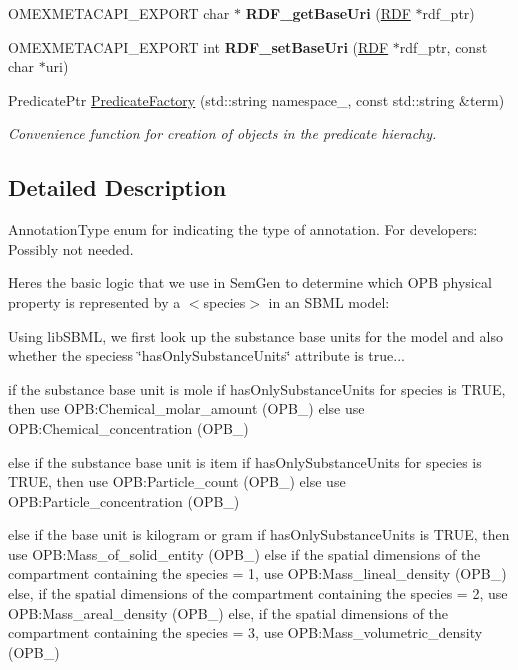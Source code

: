 \begin{DoxyCompactItemize}
\item 
\mbox{\label{namespaceomexmeta_a5d07b1a3b03615813dbb9efb62efda45}} 
O\+M\+E\+X\+M\+E\+T\+A\+C\+A\+P\+I\+\_\+\+E\+X\+P\+O\+RT char $\ast$ {\bfseries R\+D\+F\+\_\+get\+Base\+Uri} (\hyperlink{classomexmeta_1_1RDF}{R\+DF} $\ast$rdf\+\_\+ptr)
\item 
\mbox{\label{namespaceomexmeta_a64ae848c4570f1efb4d47e795b76adcd}} 
O\+M\+E\+X\+M\+E\+T\+A\+C\+A\+P\+I\+\_\+\+E\+X\+P\+O\+RT int {\bfseries R\+D\+F\+\_\+set\+Base\+Uri} (\hyperlink{classomexmeta_1_1RDF}{R\+DF} $\ast$rdf\+\_\+ptr, const char $\ast$uri)
\item 
Predicate\+Ptr \hyperlink{namespaceomexmeta_a0a8d50daa10e421d0722520cdef0ab9a}{Predicate\+Factory} (std\+::string namespace\+\_\+, const std\+::string \&term)
\begin{DoxyCompactList}\small\item\em Convenience function for creation of objects in the predicate hierachy. \end{DoxyCompactList}\end{DoxyCompactItemize}


\subsection{Detailed Description}
Annotation\+Type enum for indicating the type of annotation. For developers\+: Possibly not needed.

Here\textquotesingle{}s the basic logic that we use in Sem\+Gen to determine which O\+PB physical property is represented by a $<$species$>$ in an S\+B\+ML model\+:

Using lib\+S\+B\+ML, we first look up the substance base units for the model and also whether the species\textquotesingle{}s \char`\"{}has\+Only\+Substance\+Units\char`\"{} attribute is true...

if the substance base unit is mole if has\+Only\+Substance\+Units for species is T\+R\+UE, then use O\+PB\+:Chemical\+\_\+molar\+\_\+amount (O\+P\+B\+\_) else use O\+PB\+:Chemical\+\_\+concentration (O\+P\+B\+\_)

else if the substance base unit is item if has\+Only\+Substance\+Units for species is T\+R\+UE, then use O\+PB\+:Particle\+\_\+count (O\+P\+B\+\_) else use O\+PB\+:Particle\+\_\+concentration (O\+P\+B\+\_)

else if the base unit is kilogram or gram if has\+Only\+Substance\+Units is T\+R\+UE, then use O\+PB\+:Mass\+\_\+of\+\_\+solid\+\_\+entity (O\+P\+B\+\_) else if the spatial dimensions of the compartment containing the species = 1, use O\+PB\+:Mass\+\_\+lineal\+\_\+density (O\+P\+B\+\_) else, if the spatial dimensions of the compartment containing the species = 2, use O\+PB\+:Mass\+\_\+areal\+\_\+density (O\+P\+B\+\_) else, if the spatial dimensions of the compartment containing the species = 3, use O\+PB\+:Mass\+\_\+volumetric\+\_\+density (O\+P\+B\+\_)

